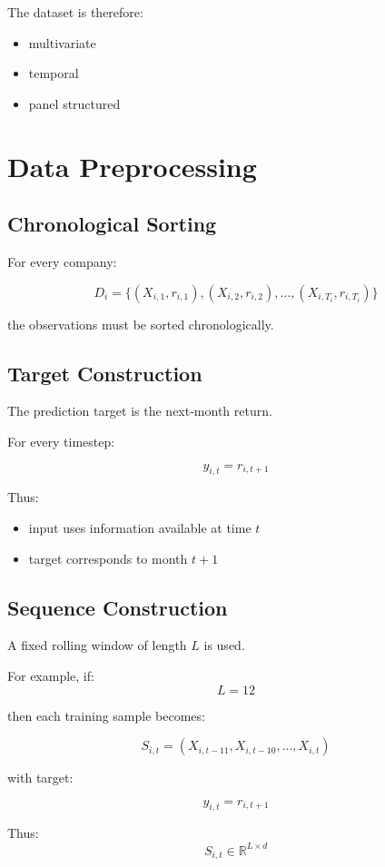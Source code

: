 \documentclass[11pt]{article}
\begin{document}
The dataset is therefore:
\begin{itemize}
    \item multivariate
    \item temporal
    \item panel structured
\end{itemize}

\section{Data Preprocessing}

\subsection{Chronological Sorting}

For every company:

\[
D_i =
\{
(X_{i,1}, r_{i,1}),
(X_{i,2}, r_{i,2}),
\dots,
(X_{i,T_i}, r_{i,T_i})
\}
\]

the observations must be sorted chronologically.

\subsection{Target Construction}

The prediction target is the next-month return.

For every timestep:

\[
y_{i,t} = r_{i,t+1}
\]

Thus:
\begin{itemize}
    \item input uses information available at time $t$
    \item target corresponds to month $t+1$
\end{itemize}

\subsection{Sequence Construction}

A fixed rolling window of length $L$ is used.

For example, if:
\[
L = 12
\]

then each training sample becomes:

\[
S_{i,t}
=
(X_{i,t-11},
X_{i,t-10},
\dots,
X_{i,t})
\]

with target:

\[
y_{i,t} = r_{i,t+1}
\]

Thus:
\[
S_{i,t} \in \mathbb{R}^{L \times d}
\]
\end{document}
